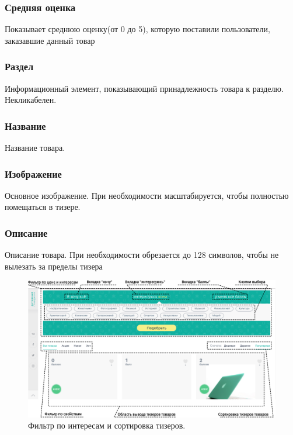             \subsubsection{Средняя оценка}
                Показывает среднюю оценку(от 0 до 5), которую поставили 
                    пользователи, 
                заказавшие данный товар
            \subsubsection{Раздел}
                Информационный элемент, показывающий принадлежность товара к 
                    разделю.
                Некликабелен.
            \subsubsection{Название}
                Название товара.
            \subsubsection{Изображение}
                Основное изображение. При необходимости масштабируется, чтобы 
                полностью помещаться в тизере.
            \subsubsection{Описание}
                Описание товара. При необходимости обрезается до 128 символов, 
                чтобы не вылезать за пределы тизера


        \begin{figure}[h]
            \center
            \includegraphics[width=170mm]{02_noauth_funcs/figures/02.eps}
            \caption{Фильтр по интересам и сортировка тизеров.}
            \label{fig:common_items_5}
        \end{figure}

